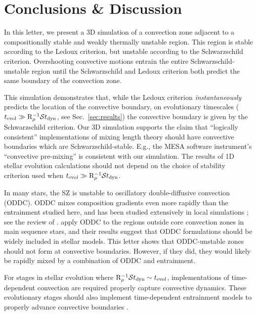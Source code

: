 \section{Conclusions \& Discussion}
\label{sec:conclusions}

In this letter, we present a 3D simulation of a convection zone adjacent to a compositionally stable and weakly thermally unstable region.
This region is stable according to the Ledoux criterion, but unstable according to the Schwarzschild criterion.
Overshooting convective motions entrain the entire Schwarzschild-unstable region until the Schwarzschild and Ledoux criterion both predict the same boundary of the convection zone.

This simulation demonstrates that, while the Ledoux criterion \emph{instantaneously} predicts the location of the convective boundary, on evolutionary timescales ($t_{\rm{evol}} \gg \mathrm{R}_{\rho}^{-1}\mathcal{S} t_{\rm{dyn}}$, see Sec.~\ref{sec:results}) the convective boundary is given by the Schwarzschild criterion.
Our 3D simulation supports the claim that ``logically consistent'' implementations of mixing length theory \citep{gabriel_etal_2014, mesa4, mesa5} should have convective boundaries which are Schwarzschild-stable.
E.g., the MESA software instrument's ``convective pre-mixing'' \citep[CPM,][]{mesa5} is consistent with our simulation.
The results of 1D stellar evolution calculations should not depend on the choice of stability criterion used when $t_{\rm{evol}} \gg \mathrm{R}_{\rho}^{-1}\mathcal{S} t_{\rm{dyn}}$.

In many stars, the SZ is unstable to oscillatory double-diffusive convection (ODDC).
ODDC mixes composition gradients even more rapidly than the entrainment studied here, and has been studied extensively in local simulations \citep{mirouh_etal_2012, wood_etal_2013, xie_etal_2017}; see the review of \citet{garaud_2018}.
\citet{moore_garaud_2016} apply ODDC to the regions outside core convection zones in main sequence stars, and their results suggest that ODDC formulations should be widely included in stellar models.
This letter shows that ODDC-unstable zones should not form at convective boundaries.
However, if they did, they would likely be rapidly mixed by a combination of ODDC and entrainment.

For stages in stellar evolution where $\mathrm{R}_{\rho}^{-1}\mathcal{S} t_{\rm{dyn}} \sim t_{\rm{evol}}$, implementations of time-dependent convection \citep[TDC,][]{tdc_1986} are required properly capture convective dynamics.
These evolutionary stages should also implement time-dependent entrainment models to properly advance convective boundaries \citep[e.g.,][]{turner_1968, fuentes_cumming_2020}.


